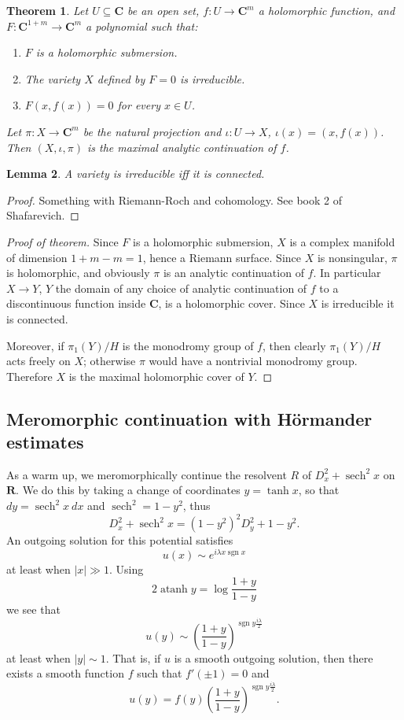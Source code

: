 \documentclass[reqno,12pt,letterpaper]{amsart}
\newcommand{\RR}{\mathbf{R}}
\newcommand{\CC}{\mathbf{C}}
\DeclareMathOperator{\sgn}{sgn}
\DeclareMathOperator{\atanh}{atanh}
\DeclareMathOperator{\sech}{sech}
\newtheorem{theorem}{Theorem}[section]
\newtheorem{lemma}[theorem]{Lemma}
\theoremstyle{definition}
\begin{document}
\begin{theorem}
Let $U \subseteq \CC$ be an open set, $f: U \to \CC^m$ a holomorphic function, and $F: \CC^{1 + m} \to \CC^m$ a polynomial such that:
\begin{enumerate}
\item $F$ is a holomorphic submersion.
\item The variety $X$ defined by $F = 0$ is irreducible.
\item $F(x, f(x)) = 0$ for every $x \in U$.
\end{enumerate}
Let $\pi: X \to \CC^m$ be the natural projection and $\iota: U \to X$, $\iota(x) = (x, f(x))$. Then $(X, \iota, \pi)$ is the maximal analytic continuation of $f$.
\end{theorem}
\begin{lemma}
A variety is irreducible iff it is connected.
\end{lemma}
\begin{proof}
Something with Riemann-Roch and cohomology. See book 2 of Shafarevich.
\end{proof}
\begin{proof}[Proof of theorem]
Since $F$ is a holomorphic submersion, $X$ is a complex manifold of dimension $1+m - m = 1$, hence a Riemann surface.
Since $X$ is nonsingular, $\pi$ is holomorphic, and obviously $\pi$ is an analytic continuation of $f$.
In particular $X \to Y$, $Y$ the domain of any choice of analytic continuation of $f$ to a discontinuous function inside $\CC$, is a holomorphic cover.
Since $X$ is irreducible it is connected.

Moreover, if $\pi_1(Y)/H$ is the monodromy group of $f$, then clearly $\pi_1(Y)/H$ acts freely on $X$; otherwise $\pi$ would have a nontrivial monodromy group. Therefore $X$ is the maximal holomorphic cover of $Y$.
\end{proof}

\subsection{Meromorphic continuation with H\"ormander estimates}

As a warm up, we meromorphically continue the resolvent $R$ of $D_x^2 + \sech^2 x$ on $\RR$.
We do this by taking a change of coordinates $y = \tanh x$, so that $dy = \sech^2 x~dx$ and $\sech^2 = 1 - y^2$, thus
$$D_x^2 + \sech^2 x = (1 - y^2)^2D_y^2 + 1 - y^2.$$
An outgoing solution for this potential satisfies
$$u(x) \sim e^{i\lambda x\sgn x}$$
at least when $|x| \gg 1$. Using
$$2 \atanh y = \log\frac{1+y}{1-y}$$
we see that
$$u(y) \sim \left(\frac{1+y}{1-y}\right)^{\sgn y \frac{i\lambda}{2}}$$
at least when $|y| \sim 1$. That is, if $u$ is a smooth outgoing solution, then there exists a smooth function $f$ such that $f'(\pm 1) = 0$ and
$$u(y) = f(y)\left(\frac{1+y}{1-y}\right)^{\sgn y \frac{i\lambda}{2}}.$$
\end{document}
